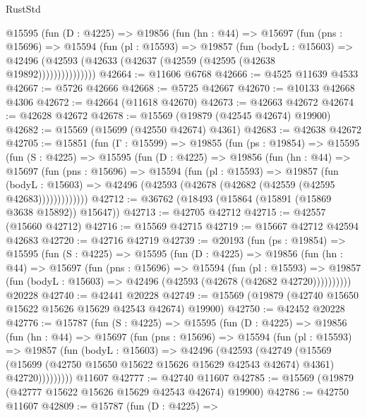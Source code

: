 \begin{lexlean}{RustStd}
\begin{coremodule}
          @15595
            (fun (D : @4225) =>
            @19856
              (fun (hn : @44) =>
              @15697
                (fun (pns : @15696) =>
                @15594
                  (fun (pl : @15593) =>
                  @19857
                    (fun (bodyL : @15603) =>
                    @42496 (@42593 (@42633 (@42637 (@42559 (@42595 (@42638 @19892)))))))))))))))
@42664 := @11606 @6768
@42666 := @4525 @11639 @4533
@42667 := @5726 @42666
@42668 := @5725 @42667
@42670 := @10133 @42668 @4306
@42672 := @42664 (@11618 @42670)
@42673 := @42663 @42672
@42674 := @42628 @42672
@42678 := @15569 (@19879 (@42545 @42674) @19900)
@42682 := @15569 (@15699 (@42550 @42674) @4361)
@42683 := @42638 @42672
@42705 := @15851
    (fun (Γ : @15599) =>
    @19855
      (fun (ps : @19854) =>
      @15595
        (fun (S : @4225) =>
        @15595
          (fun (D : @4225) =>
          @19856
            (fun (hn : @44) =>
            @15697
              (fun (pns : @15696) =>
              @15594
                (fun (pl : @15593) =>
                @19857
                  (fun (bodyL : @15603) =>
                  @42496 (@42593 (@42678 (@42682 (@42559 (@42595 @42683)))))))))))))
@42712 := @36762 (@18493 (@15864 (@15891 (@15869 @3638 @15892)) @15647))
@42713 := @42705 @42712
@42715 := @42557 (@15660 @42712)
@42716 := @15569 @42715
@42719 := @15667 @42712 @42594 @42683
@42720 := @42716 @42719
@42739 := @20193
    (fun (ps : @19854) =>
    @15595
      (fun (S : @4225) =>
      @15595
        (fun (D : @4225) =>
        @19856
          (fun (hn : @44) =>
          @15697
            (fun (pns : @15696) =>
            @15594
              (fun (pl : @15593) =>
              @19857 (fun (bodyL : @15603) => @42496 (@42593 (@42678 (@42682 @42720))))))))))
    @20228
@42740 := @42441 @20228
@42749 := @15569 (@19879 (@42740 @15650 @15622 @15626 @15629 @42543 @42674) @19900)
@42750 := @42452 @20228
@42776 := @15787
    (fun (S : @4225) =>
    @15595
      (fun (D : @4225) =>
      @19856
        (fun (hn : @44) =>
        @15697
          (fun (pns : @15696) =>
          @15594
            (fun (pl : @15593) =>
            @19857
              (fun (bodyL : @15603) =>
              @42496
                (@42593
                  (@42749
                    (@15569
                      (@15699 (@42750 @15650 @15622 @15626 @15629 @42543 @42674) @4361)
                      @42720)))))))))
    @11607
@42777 := @42740 @11607
@42785 := @15569 (@19879 (@42777 @15622 @15626 @15629 @42543 @42674) @19900)
@42786 := @42750 @11607
@42809 := @15787
    (fun (D : @4225) =>

\end{coremodule}
\end{lexlean}
